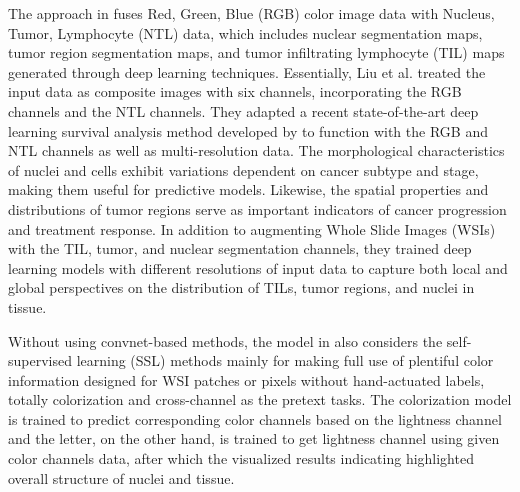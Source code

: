 \documentclass[journal,twoside,web]{ieeecolor}
\begin{document}
The approach in \cite{liu2022deep} fuses Red, Green, Blue (RGB) color image data with Nucleus, Tumor, Lymphocyte (NTL) data, which includes nuclear segmentation maps, tumor region segmentation maps, and tumor infiltrating lymphocyte (TIL) maps generated through deep learning techniques. 
Essentially, Liu et al. treated the input data as composite images with six channels, incorporating the RGB channels and the NTL channels. 
They adapted a recent state-of-the-art deep learning survival analysis method developed by \cite{wulczyn2020deep} to function with the RGB and NTL channels as well as multi-resolution data. 
The morphological characteristics of nuclei and cells exhibit variations dependent on cancer subtype and stage, making them useful for predictive models. 
Likewise, the spatial properties and distributions of tumor regions serve as important indicators of cancer progression and treatment response. 
In addition to augmenting Whole Slide Images (WSIs) with the TIL, tumor, and nuclear segmentation channels, they trained deep learning models with different resolutions of input data to capture both local and global perspectives on the distribution of TILs, tumor regions, and nuclei in tissue. 

Without using convnet-based methods, the model in \cite{fan2022cancer} also considers the self-supervised learning (SSL) methods mainly for making full use of plentiful color information designed for WSI patches or pixels without hand-actuated labels, totally colorization and cross-channel as the pretext tasks.
The colorization model is trained to predict corresponding color channels based on the lightness channel and the letter, on the other hand, is trained to get lightness channel using given color channels data, after which the visualized results indicating highlighted overall structure of nuclei and tissue.
\end{document}
